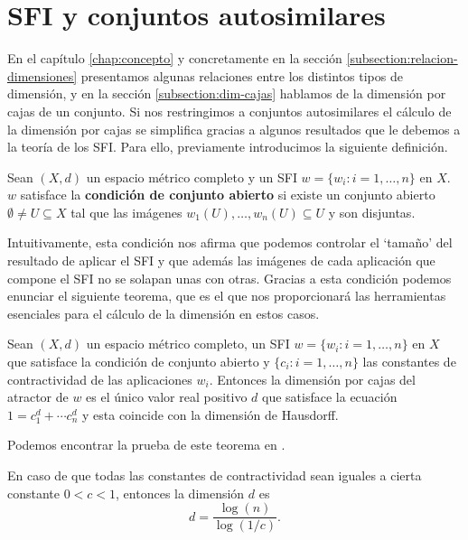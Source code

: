 \section{SFI y conjuntos autosimilares}
\label{section:sfi-conjuntos-autosimilares}

En el capítulo \ref{chap:concepto} y concretamente en la sección \ref{subsection:relacion-dimensiones} presentamos algunas relaciones entre los distintos tipos de dimensión, y en la sección \ref{subsection:dim-cajas} hablamos de la dimensión por cajas de un conjunto. Si nos restringimos a conjuntos autosimilares el cálculo de la dimensión por cajas se simplifica gracias a algunos resultados que le debemos a la teoría de los SFI. Para ello, previamente introducimos la siguiente definición.

\begin{definicion}
    \label{def:condicion-conjunto-abierto}
    Sean $(X,d)$ un espacio métrico completo y un SFI $w=\{w_i:i=1,\dots,n\}$ en $X$. $w$ satisface la \textbf{condición de conjunto abierto} si existe un conjunto abierto $\emptyset\not= U\subseteq X$ tal que las imágenes $w_1(U),\dots,w_n(U)\subseteq U$ y son disjuntas.
\end{definicion}

Intuitivamente, esta condición nos afirma que podemos controlar el `tamaño' del resultado de aplicar el SFI y que además las imágenes de cada aplicación que compone el SFI no se solapan unas con otras. Gracias a esta condición podemos enunciar el siguiente teorema, que es el que nos proporcionará las herramientas esenciales para el cálculo de la dimensión en estos casos.

\begin{teorema}
    \label{th:Moran}
    Sean $(X,d)$ un espacio métrico completo, un SFI $w=\{w_i:i=1,\dots,n\}$ en $X$ que satisface la condición de conjunto abierto y $\{c_i:i=1,\dots,n\}$ las constantes de contractividad de las aplicaciones $w_i$. Entonces la dimensión por cajas del atractor de $w$ es el único valor real positivo $d$ que satisface la ecuación $1 = c_1^d + \cdots c_n^d$ y esta coincide con la dimensión de Hausdorff.
\end{teorema}

Podemos encontrar la prueba de este teorema en \cite{Moran}.

\begin{corolario}
    En caso de que todas las constantes de contractividad sean iguales a cierta constante $0<c<1$, entonces la dimensión $d$ es
    $$
    d = \dfrac{\log(n)}{\log(1/c)}.
    $$
\end{corolario}

